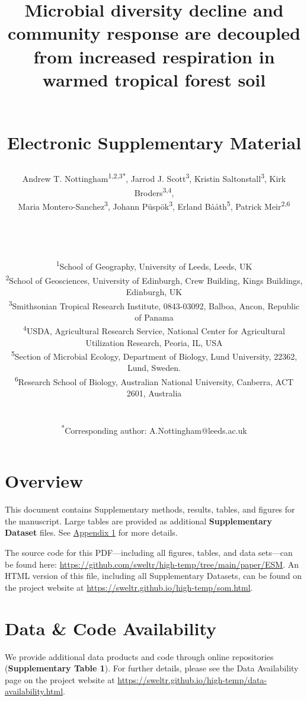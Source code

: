 \documentclass[
  10pt,
  letterpaper,
  DIV=11,
  numbers=noendperiod]{scrartcl}
\date{}
\title{\LARGE Microbial diversity decline and community response are
decoupled from increased respiration in warmed tropical forest soil\\
\strut \\
Electronic Supplementary Material}
\author{Andrew T. Nottingham\textsuperscript{1,2,3*}, Jarrod J.
Scott\textsuperscript{3}, Kristin Saltonstall\textsuperscript{3}, Kirk
Broders\textsuperscript{3,4},\\
Maria Montero-Sanchez\textsuperscript{3}, Johann
Püspök\textsuperscript{3}, Erland Bååth\textsuperscript{5}, Patrick
Meir\textsuperscript{2,6}\\
\strut \\
\strut \\
\RaggedRight \small \textsuperscript{1}School of Geography, University
of Leeds, Leeds, UK\\
\small \textsuperscript{2}School of Geosciences, University of
Edinburgh, Crew Building, Kings Buildings, Edinburgh, UK\\
\small \textsuperscript{3}Smithsonian Tropical Research Institute,
0843-03092, Balboa, Ancon, Republic of Panama\\
\small \textsuperscript{4}USDA, Agricultural Research Service, National
Center for Agricultural Utilization Research, Peoria, IL, USA\\
\small \textsuperscript{5}Section of Microbial Ecology, Department of
Biology, Lund University, 22362, Lund, Sweden.\\
\small \textsuperscript{6}Research School of Biology, Australian
National University, Canberra, ACT 2601, Australia\\
\strut \\
\small \textsuperscript{*}Corresponding author:
A.Nottingham@leeds.ac.uk}
\date{}
\renewcommand*\contentsname{Table of contents}
\newcommand\contentsname{Table of contents}
\begin{document}
\maketitle
\ifdefined\Shaded\renewenvironment{Shaded}{\begin{tcolorbox}[breakable, boxrule=0pt, sharp corners, enhanced, borderline west={3pt}{0pt}{shadecolor}, interior hidden, frame hidden]}{\end{tcolorbox}}\fi

\renewcommand*\contentsname{Contents}
{
\hypersetup{linkcolor=}
\setcounter{tocdepth}{2}
\tableofcontents
}
\listoffigures
\listoftables
\hypertarget{overview}{%
\section{Overview}\label{overview}}

This document contains Supplementary methods, results, tables, and
figures for the manuscript. Large tables are provided as additional
\textbf{Supplementary Dataset} files. See
\hyperref[appendix-1]{\color{blue}Appendix 1} for more details.

\begin{tcolorbox}[enhanced jigsaw, breakable, left=2mm, opacityback=0, colback=white, rightrule=.15mm, bottomrule=.15mm, arc=.35mm, leftrule=.75mm, toprule=.15mm, colframe=quarto-callout-note-color-frame]
The source code for this PDF---including all figures, tables, and data
sets---can be found here:
\url{https://github.com/sweltr/high-temp/tree/main/paper/ESM}. An HTML
version of this file, including all Supplementary Datasets, can be found
on the project website at
\url{https://sweltr.github.io/high-temp/som.html}.
\end{tcolorbox}

\hypertarget{data-code-availability}{%
\section{Data \& Code Availability}\label{data-code-availability}}

We provide additional data products and code through online repositories
(\textbf{Supplementary Table 1}). For further details, please see the
Data Availability page on the project website at
\url{https://sweltr.github.io/high-temp/data-availability.html}.
\end{document}
